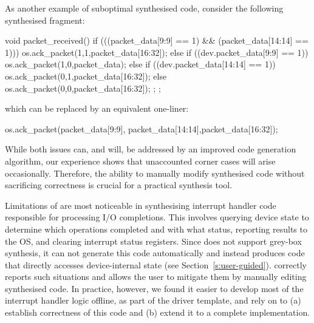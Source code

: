 As another example of suboptimal synthesised code, consider the following synthesised fragment:

\vspace{5mm}
\begin{tsllisting}
void packet_received() {
    if (((packet_data[9:9] == 1) && (packet_data[14:14] == 1))) {
        os.ack_packet(1,1,packet_data[16:32]);
    } else if ((dev.packet_data[9:9] == 1)) {
        os.ack_packet(1,0,packet_data);
    } else if ((dev.packet_data[14:14] == 1)) {
        os.ack_packet(0,1,packet_data[16:32]);
    } else {
        os.ack_packet(0,0,packet_data[16:32]);
    };
};
\end{tsllisting}
\vspace{3mm}

which can be replaced by an equivalent one-liner:

\vspace{5mm}
\begin{tsllisting}
os.ack_packet(packet_data[9:9],
    packet_data[14:14],packet_data[16:32]);
\end{tsllisting}
\vspace{5mm}

\noindent While both issues can, and will, be addressed by an improved code generation algorithm, our experience shows that unaccounted corner cases will arise occasionally.  Therefore, the ability to manually modify synthesised code without sacrificing correctness is crucial for a practical synthesis tool.

Limitations of \termite are most noticeable in synthesising interrupt handler code responsible for processing I/O completions.  This involves querying device state to determine which operations completed and with what status, reporting results to the OS, and clearing interrupt status registers.  Since \termite does not support grey-box synthesis, it can not generate this code automatically and instead produces code that directly accesses device-internal state (see Section~\ref{s:user-guided}).  \termite correctly reports such situations and allows the user to mitigate them by manually editing synthesised code.  In practice, however, we found it easier to develop most of the interrupt handler logic offline, as part of the driver template, and rely on \termite to (a) establish correctness of this code and (b) extend it to a complete implementation.

